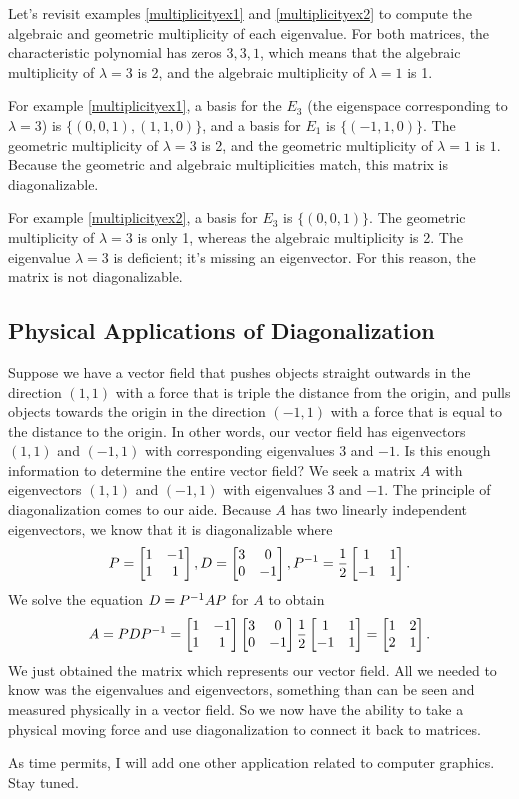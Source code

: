 \begin{example}
Let's revisit examples \ref{multiplicityex1} and  \ref{multiplicityex2} to compute the algebraic and geometric multiplicity of each eigenvalue.  For both matrices, the characteristic polynomial has zeros $3,3,1$, which means that the algebraic multiplicity of $\lambda=3$ is 2, and the algebraic multiplicity of $\lambda=1$ is 1. 

For example \ref{multiplicityex1},
a basis for the $E_3$ (the eigenspace corresponding to $\lambda = 3$) is $\{(0,0,1), (1,1,0)\}$, and a basis for $E_1$ is $\{(-1,1,0)\}$. The geometric multiplicity of $\lambda =3$ is 2, and the geometric multiplicity of $\lambda = 1$ is $1$.  Because the geometric and algebraic multiplicities match, this matrix is diagonalizable.

For example \ref{multiplicityex2}, a basis for $E_3$ is $\{(0,0,1)\}$. The geometric multiplicity of $\lambda = 3$ is only 1, whereas the algebraic multiplicity is 2. The eigenvalue $\lambda=3$ is deficient; it's missing an eigenvector.  For this reason, the matrix is not diagonalizable.
\end{example}

\subsection{Physical Applications of Diagonalization}
Suppose we have a vector field that pushes objects straight outwards in the direction $(1,1)$ with a force that is triple the distance from the origin, and pulls objects towards the origin in the direction $(-1,1)$ with a force that is equal to the distance to the origin. In other words, our vector field has eigenvectors $(1,1)$ and $(-1,1)$ with corresponding eigenvalues $3$ and $-1$. Is this enough information to determine the entire vector field?  We seek a matrix $A$ with eigenvectors $(1,1)$ and $(-1,1)$ with eigenvalues 3 and $-1$.  The principle of diagonalization comes to our aide.  Because $A$ has two linearly independent eigenvectors, we know that it is diagonalizable where $$ P = \begin{bmatrix} 1&-1\\1&1 \end{bmatrix}, D = \begin{bmatrix} 3&0\\0&-1 \end{bmatrix},P^{-1} =\frac12\begin{bmatrix} 1&1\\-1&1 \end{bmatrix}. $$ We solve the equation $D = P^{-1} A P$ for $A$ to obtain 
$$A = PDP^{-1} = \begin{bmatrix} 1&-1\\1&1 \end{bmatrix}\begin{bmatrix} 3&0\\0&-1 \end{bmatrix}\frac12\begin{bmatrix} 1&1\\-1&1 \end{bmatrix} = \begin{bmatrix} 1&2\\2&1 \end{bmatrix}.$$
We just obtained the matrix which represents our vector field. All we needed to know was the eigenvalues and eigenvectors, something than can be seen and measured physically in a vector field. So we now have the ability to take a physical moving force and use diagonalization to connect it back to matrices.  

As time permits, I will add one other application related to computer graphics. Stay tuned.




